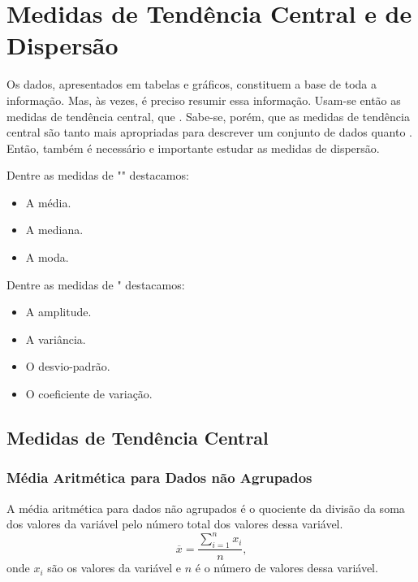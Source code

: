 \documentclass[11pt,fleqn]{book}
\numberwithin{mpicture}{chapter}
\numberwithin{mtable}{chapter}
\numberwithin{mframe}{chapter}
\begin{document}


\section{Medidas de Tendência Central e de Dispersão}

Os dados, apresentados em tabelas e gráficos, constituem a base de toda a informação. Mas, às vezes, é preciso resumir essa informação. Usam-se então as medidas de tendência central, que . Sabe-se, porém, que as medidas de tendência central são tanto mais apropriadas para descrever um conjunto de dados quanto . Então, também é necessário e importante estudar as medidas de dispersão.

Dentre as medidas de "" destacamos:
\begin{itemize}
	\item A média.
	\item A mediana.
	\item A moda.
\end{itemize}

Dentre as medidas de " destacamos:
\begin{itemize}
	\item A amplitude.
	\item A variância.
	\item O desvio-padrão.
	\item O coeficiente de variação.
\end{itemize}

\subsection{Medidas de Tendência Central}

\subsubsection{Média Aritmética para Dados não Agrupados}

A média aritmética para dados não agrupados é o quociente da divisão da soma dos valores da variável pelo número total dos valores dessa variável.
\[
	\overline{x} = \frac{\displaystyle\sum_{i=1}^{n} x_i}{n}
	\text{,}
\]
onde $x_i$ são os valores da variável e $n$ é o número de valores dessa variável.
\end{document}
